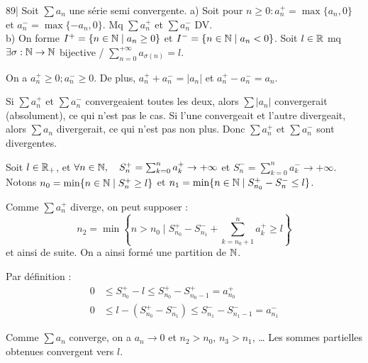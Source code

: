 
\begin{statementbox}
89| Soit $\sum a_n$ une série semi convergente.
a) Soit pour $n \geq 0 : a_n^+ = \max\{a_n, 0\}$ et $a_n^- = \max\{-a_n, 0\}$. Mq $\sum a_n^+$ et $\sum a_n^-$ DV. \\
b) On forme $I^+ = \{n \in \mathbb N \mid a_n \geq 0\}$ et $I^- = \{n \in \mathbb N \mid a_n < 0\}$. Soit $l \in \mathbb R$ mq $\exists \sigma : \mathbb N \to \mathbb N$ bijective / $\sum_{n=0}^{+\infty} a_{\sigma(n)} = l$.
\end{statementbox}

\begin{solution}
On a $a_n^+ \geq 0 ; a_n^- \geq 0$.
De plus, $a_n^+ + a_n^- = |a_n|$ et $a_n^+ - a_n^- = a_n$.

Si $\sum a_n^+$ et $\sum a_n^-$ convergeaient toutes les deux, alors $\sum |a_n|$ convergerait (absolument), ce qui n'est pas le cas.
Si l'une convergeait et l'autre divergeait, alors $\sum a_n$ divergerait, ce qui n'est pas non plus.
Donc $\sum a_n^+$ et $\sum a_n^-$ sont divergentes.

Soit $l \in \mathbb R_+$, et $\forall n \in \mathbb N, \quad S_n^+ = \sum_{k=0}^n a_k^+ \to +\infty$ et $S_n^- = \sum_{k=0}^n a_k^- \to +\infty$.
Notons $n_0 = \min\{n \in \mathbb N \mid S_n^+ \geq l\}$ et $n_1 = \min\{n \in \mathbb N \mid S_{n_0}^+ - S_n^- \leq l\}$.

\begin{center}
\end{center}

Comme $\sum a_n^+$ diverge, on peut supposer :
\[ n_2 = \min\left\{n > n_0 \mid S_{n_0}^+ - S_{n_1}^- + \sum_{k=n_0+1}^n a_k^+ \geq l\right\} \]
et ainsi de suite.
On a ainsi formé une partition de $\mathbb N$.

Par définition :
\begin{align*}
0 &\leq S_{n_0}^+ - l \leq S_{n_0}^+ - S_{n_0-1}^+ = a_{n_0}^+ \\
0 &\leq l - (S_{n_0}^+ - S_{n_1}^-) \leq S_{n_1}^- - S_{n_1-1}^- = a_{n_1}^-
\end{align*}

Comme $\sum a_n$ converge, on a $a_n \to 0$ et $n_2 > n_0$, $n_3 > n_1$, \dots
Les sommes partielles obtenues convergent vers $l$.


\end{solution}
